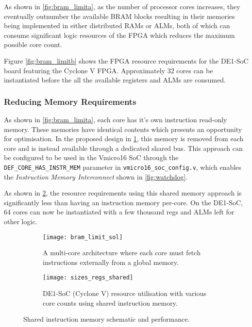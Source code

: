 As shown in \cref{fig:bram_limita}, as the number of processor cores increases, they eventually outnumber the available BRAM blocks resulting in their memories being implemented in either distributed RAMs or ALMs, both of which can consume significant logic resources of the FPGA which reduces the maximum possible core count.

Figure \cref{fig:bram_limitb} shows the FPGA resource requirements for the DE1-SoC board featuring the Cyclone V FPGA. Approximately 32 cores can be instantiated before the all the available registers and ALMs are consumed.

\subsubsection{Reducing Memory Requirements}
\label{sec:anal_memory}
As shown in \cref{fig:bram_limita}, each core has it's own instruction read-only memory. These memories have identical contents which presents an opportunity for optimisation. In the proposed design in \cref{fig:bram_limit_sola}, this memory is removed from each core and is instead available through a dedicated shared bus. This approach can be configured to be used in the Vmicro16 SoC through the \verb|DEF_CORE_HAS_INSTR_MEM| parameter in \verb|vmicro16_soc_config.v|, which enables the \textit{Instruction Memory Interconnect} shown in \cref{fig:watchdog}.

As shown in \cref{fig:bram_limit_solb}, the resource requirements using this shared memory approach is significantly less than having an instruction memory per-core. On the DE1-SoC, 64 cores can now be instantiated with a few thousand regs and ALMs left for other logic.


\begin{figure}[H]
\begin{subfigure}{.5\textwidth}
  \centering
  \texttt{[image: bram\_limit\_sol]}
  \caption{A multi-core architecture where each core must fetch instructions externally from a global memory.}
  \label{fig:bram_limit_sola}
\end{subfigure}%
\begin{subfigure}{.5\textwidth}
  \centering
  \texttt{[image: sizes\_regs\_shared]}
  \caption{DE1-SoC (Cyclone V) resource utilisation with various core counts using shared instruction memory.}
  \label{fig:bram_limit_solb}
\end{subfigure}
\caption{Shared instruction memory schematic and performance.}
\label{fig:bram_limit_sol}
\end{figure}

